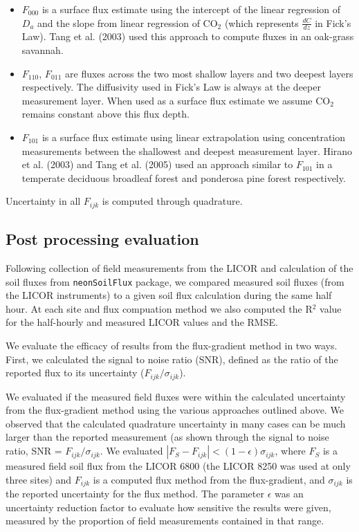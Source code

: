 \documentclass[
  letterpaper,
  DIV=11,
  numbers=noendperiod]{scrartcl}
\providecommand{\tightlist}{%
  \setlength{\itemsep}{0pt}\setlength{\parskip}{0pt}}\usepackage{longtable,booktabs,array}
\begin{document}
\begin{itemize}
\tightlist
\item
  \(F_{000}\) is a surface flux estimate using the intercept of the
  linear regression of \(D_{a}\) and the slope from linear regression of
  CO\(_{2}\) (which represents \(\frac{dC}{dz}\) in Fick's Law). Tang et
  al. (2003) used this approach to compute fluxes in an oak-grass
  savannah.
\item
  \(F_{110}\), \(F_{011}\) are fluxes across the two most shallow layers
  and two deepest layers respectively. The diffusivity used in Fick's
  Law is always at the deeper measurement layer. When used as a surface
  flux estimate we assume CO\(_{2}\) remains constant above this flux
  depth.
\item
  \(F_{101}\) is a surface flux estimate using linear extrapolation
  using concentration measurements between the shallowest and deepest
  measurement layer. Hirano et al. (2003) and Tang et al. (2005) used an
  approach similar to \(F_{101}\) in a temperate deciduous broadleaf
  forest and ponderosa pine forest respectively.
\end{itemize}

Uncertainty in all \(F_{ijk}\) is computed through quadrature.

\subsection{Post processing
evaluation}\label{post-processing-evaluation}

Following collection of field measurements from the LICOR and
calculation of the soil fluxes from \texttt{neonSoilFlux} package, we
compared measured soil fluxes (from the LICOR instruments) to a given
soil flux calculation during the same half hour. At each site and flux
compuation method we also computed the R\(^{2}\) value for the
half-hourly and measured LICOR values and the RMSE.

We evaluate the efficacy of results from the flux-gradient method in two
ways. First, we calculated the signal to noise ratio (SNR), defined as
the ratio of the reported flux to its uncertainty
(\(F_{ijk}/\sigma_{ijk}\)).

We evaluated if the measured field fluxes were within the calculated
uncertainty from the flux-gradient method using the various approaches
outlined above. We observed that the calculated quadrature uncertainty
in many cases can be much larger than the reported measurement (as shown
through the signal to noise ratio, SNR = \(F_{ijk}/\sigma_{ijk}\). We
evaluated \(| F_{S} - F_{ijk} | < (1-\epsilon) \sigma_{ijk}\), where
\(F_{S}\) is a measured field soil flux from the LICOR 6800 (the LICOR
8250 was used at only three sites) and \(F_{ijk}\) is a computed flux
method from the flux-gradient, and \(\sigma_{ijk}\) is the reported
uncertainty for the flux method. The parameter \(\epsilon\) was an
uncertainty reduction factor to evaluate how sensitive the results were
given, measured by the proportion of field measurements contained in
that range.
\end{document}
